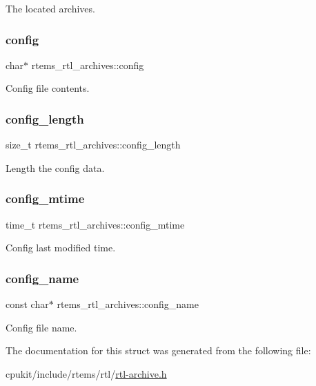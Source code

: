 The located archives. \mbox{\label{structrtems__rtl__archives_a1f4ed598e54339767feb39d5267e6fc3}} 
\subsubsection{\texorpdfstring{config}{config}}
{\footnotesize\ttfamily char$\ast$ rtems\+\_\+rtl\+\_\+archives\+::config}

Config file contents. \mbox{\label{structrtems__rtl__archives_a3238bd6c9c686d395ccaa62e9345737f}} 
\subsubsection{\texorpdfstring{config\_length}{config\_length}}
{\footnotesize\ttfamily size\+\_\+t rtems\+\_\+rtl\+\_\+archives\+::config\+\_\+length}

Length the config data. \mbox{\label{structrtems__rtl__archives_a397d53aae05dbbdcb91bbca51293367f}} 
\subsubsection{\texorpdfstring{config\_mtime}{config\_mtime}}
{\footnotesize\ttfamily time\+\_\+t rtems\+\_\+rtl\+\_\+archives\+::config\+\_\+mtime}

Config last modified time. \mbox{\label{structrtems__rtl__archives_a6ce647b9a0a90dabb2f29cd2aae23a1d}} 
\subsubsection{\texorpdfstring{config\_name}{config\_name}}
{\footnotesize\ttfamily const char$\ast$ rtems\+\_\+rtl\+\_\+archives\+::config\+\_\+name}

Config file name. 

The documentation for this struct was generated from the following file\+:\begin{DoxyCompactItemize}
\item 
cpukit/include/rtems/rtl/\mbox{\hyperlink{rtl-archive_8h}{rtl-\/archive.\+h}}\end{DoxyCompactItemize}
